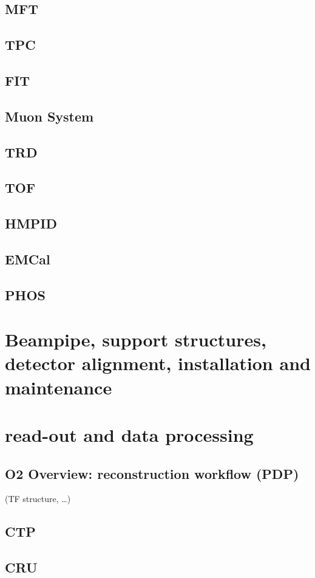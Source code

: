 \documentclass[ALICE,manyauthors]{cernphprep}
\begin{document}
\subsection{MFT}
\subsection{TPC}
\subsection{FIT}
\subsection{Muon System}
\subsection{TRD}
\subsection{TOF}
\subsection{HMPID}
\subsection{EMCal}
\subsection{PHOS}

\section{Beampipe, support structures, detector alignment, installation and maintenance}

\section{read-out and data processing}
\subsection{O2 Overview: reconstruction workflow (PDP)}
(TF structure, …)
\subsection{CTP}
\subsection{CRU}
\end{document}

